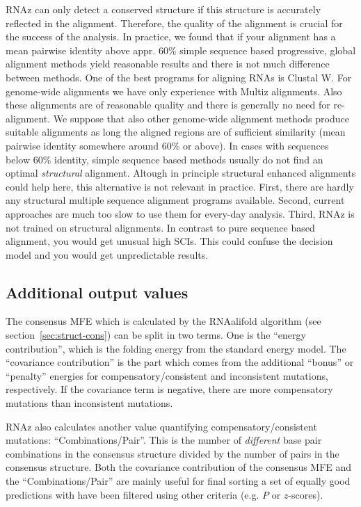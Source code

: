 \documentclass[11pt]{article}
\begin{document}
RNAz can only detect a conserved structure if this structure is accurately
reflected in the alignment. Therefore, the quality of the alignment is
crucial for the success of the analysis. In practice, we found that if your
alignment has a mean pairwise identity above appr. 60\% simple sequence
based progressive, global alignment methods yield reasonable results and
there is not much difference between methods. One of the best programs for
aligning RNAs is Clustal W. For genome-wide alignments we have only
experience with Multiz alignments. Also these alignments are of reasonable
quality and there is generally no need for re-alignment. We suppose that
also other genome-wide alignment methods produce suitable alignments as
long the aligned regions are of sufficient similarity (mean pairwise
identity somewhere around $60\%$ or above). In cases with sequences below
60\% identity, simple sequence based methods usually do not find an optimal
\emph{structural} alignment. Altough in principle structural enhanced
alignments could help here, this alternative is not relevant in practice.
First, there are hardly any structural multiple sequence alignment programs
available. Second, current approaches are much too slow to use them for
every-day analysis. Third, RNAz is not trained on structural alignments. In
contrast to pure sequence based alignment, you would get unusual high SCIs.
This could confuse the decision model and you would get unpredictable
results.

\subsection{Additional output values}
\label{sec:addit-outp-valu}

The consensus MFE which is calculated by the RNAalifold algorithm (see
section~\ref{sec:struct-cons}) can be split in two terms.  One is the
``energy contribution'', which is the folding energy from the standard
energy model. The ``covariance contribution'' is the part which comes from
the additional ``bonus'' or ``penalty'' energies for
compensatory/consistent and inconsistent mutations, respectively. If the
covariance term is negative, there are more compensatory mutations than
inconsistent mutations.

RNAz also calculates another value quantifying compensatory/consistent
mutations: ``Combinations/Pair''. This is the number of \emph{different}
base pair combinations in the consensus structure divided by the number of
pairs in the consensus structure. Both the covariance contribution of the
consensus MFE and the ``Combinations/Pair'' are mainly useful for final
sorting a set of equally good predictions with have been filtered using
other criteria (e.g. $P$ or $z$-scores).
\end{document}
